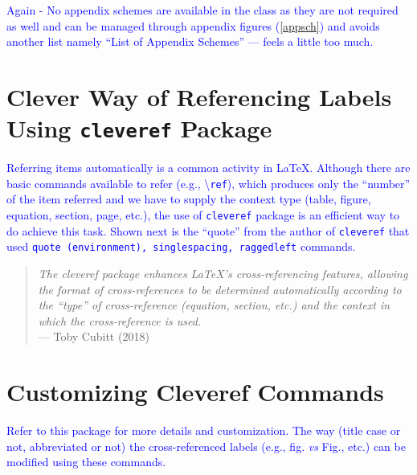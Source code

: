 \documentclass[phd]{ndsu-thesis-2022}
\newcommand\italk[1]{\textcolor{blue}{#1}}  %
\newcommand\cmd[1]{\textbackslash\texttt{#1}}  %
\begin{document}
\kant[4]\kant[9]

\italk{Again - No appendix schemes are available in the class as they are not required as well and can be managed through appendix figures (\cref{appsch}) and avoids another list namely ``List of Appendix Schemes'' --- feels a little too much.}




\section{Clever Way of Referencing Labels Using \texttt{cleveref} Package}
\italk{Referring items automatically is a common activity in \LaTeX. Although there are basic commands available to refer (e.g., \cmd{ref}), which produces only the ``number'' of the item referred and we have to supply the context type (table, figure, equation, section, page, etc.), the use of \texttt{cleveref} package is an efficient way to do achieve this task. Shown next is the ``quote'' from the author of \texttt{cleveref} that used \texttt{quote (environment), singlespacing, raggedleft} commands.}

\vspace{-4ex}
\textcolor{magenta}{
\begin{quote}
\singlespacing
\raggedleft
\textit{The cleveref package enhances \LaTeX's cross-referencing features, allowing the format of cross-references to be determined automatically according to the ``type'' of cross-reference (equation, section, etc.) and the context in which the cross-reference is used.} 
\\\hfill --- Toby Cubitt (2018)
\end{quote}
}

\section{Customizing Cleveref Commands}
\italk{Refer to this package for more details and customization. The way (title case or not, abbreviated or not) the cross-referenced labels (e.g., fig. \emph{vs} Fig., etc.) can be modified using these commands. 
}
\end{document}
